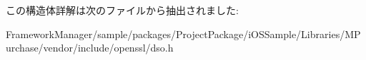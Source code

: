 この構造体詳解は次のファイルから抽出されました\+:\begin{DoxyCompactItemize}
\item 
Framework\+Manager/sample/packages/\+Project\+Package/i\+O\+S\+Sample/\+Libraries/\+M\+Purchase/vendor/include/openssl/dso.\+h\end{DoxyCompactItemize}
